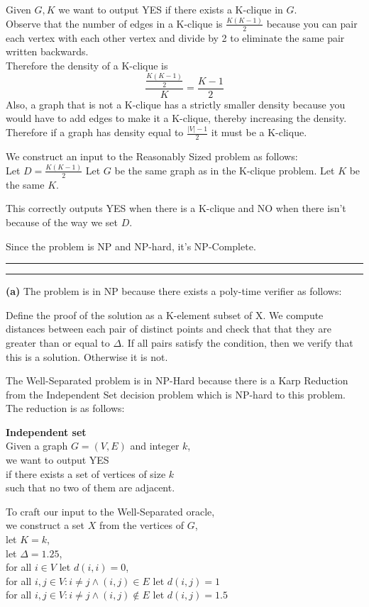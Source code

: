 \documentclass[11pt]{article}
\newcommand{\question}[2] {\vspace{.25in} \hrule\vspace{0.5em}
\noindent{\bf #1: #2} \vspace{0.5em}
\hrule \vspace{.10in}}
\renewcommand{\part}[1] {\vspace{.10in} {\bf (#1)}}
\begin{document}
Given $G, K$ we want to output YES if there exists a K-clique in $G$.\\

Observe that the number of edges in a K-clique is $\frac{K(K-1)}{2}$ because you can pair each vertex with each other vertex and divide by 2 to eliminate the same pair written backwards.\\
Therefore the density of a K-clique is $$\frac{\frac{K(K-1)}{2}}{K} = \frac{K-1}{2}$$
Also, a graph that is not a K-clique has a strictly smaller density because you would have to add edges to make it a K-clique, thereby increasing the density.\\
Therefore if a graph has density equal to $\frac{|V| - 1}{2}$ it must be a K-clique.

We construct an input to the Reasonably Sized problem as follows:\\
Let $D = \frac{K(K-1)}{2}$
Let $G$ be the same graph as in the K-clique problem.
Let $K$ be the same $K$.

This correctly outputs YES when there is a K-clique and NO when there isn't because of the way we set $D$.

Since the problem is NP and NP-hard, it's NP-Complete.

\question{3}{A Well-Separated Problem}
\part{a}
The problem is in NP because there exists a poly-time verifier as follows:

Define the proof of the solution as a K-element subset of X. We compute distances
between each pair of distinct points and check that that they are greater than or equal to $\Delta$.
If all pairs satisfy the condition, then we verify that this is a solution. Otherwise it is not.

The Well-Separated problem is in NP-Hard because there is a Karp Reduction from the Independent Set decision problem which is NP-hard to this problem.
The reduction is as follows:

\textbf{Independent set}\\
Given a graph $G = (V,E)$ and integer $k$,\\
we want to output YES\\
if there exists a set of vertices of size $k$\\
such that no two of them are adjacent.

To craft our input to the Well-Separated oracle,\\
we construct a set $X$ from the vertices of $G$,\\
let $K = k$,\\
let $\Delta = 1.25$,\\
for all $i \in V$ let $d(i,i) = 0$,\\
for all $i,j \in V : i \neq j \wedge (i,j) \in E$ let $d(i,j) = 1$\\
for all $i,j \in V : i \neq j \wedge (i,j) \notin E$ let $d(i,j) = 1.5$
\end{document}
